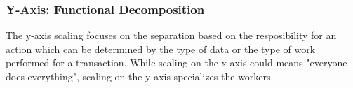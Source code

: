 \subsubsection{Y-Axis: Functional Decomposition}

The y-axis scaling focuses on the separation based on the resposibility for an
action which can be determined by the type of data or the type of work performed
for a transaction. While scaling on the x-axis could means "everyone does
everything", scaling on the y-axis specializes the workers.
